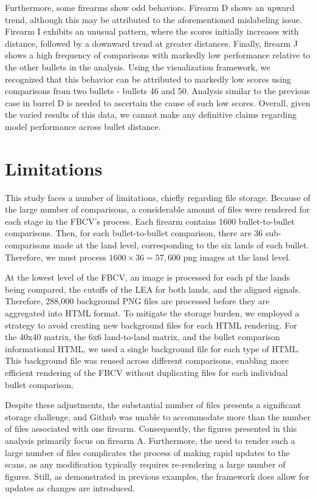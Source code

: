\documentclass[
  number,
  preprint,
  5p,
  twocolumn]{elsarticle}
\begin{document}
Furthermore, some firearms show odd behaviors. Firearm D shows an upward
trend, although this may be attributed to the aforementioned mislabeling
issue. Firearm I exhibits an unusual pattern, where the scores initially
increases with distance, followed by a downward trend at greater
distances. Finally, firearm J shows a high frequency of comparisons with
markedly low performance relative to the other bullets in the analysis.
Using the visualization framework, we recognized that this behavior can
be attributed to markedly low scores using comparisons from two bullets
- bullets 46 and 50. Analysis similar to the previous case in barrel D
is needed to ascertain the cause of such low scores. Overall, given the
varied results of this data, we cannot make any definitive claims
regarding model performance across bullet distance.

\section{Limitations}\label{limitations}

This study faces a number of limitations, chiefly regarding file
storage. Because of the large number of comparisons, a considerable
amount of files were rendered for each stage in the FBCV's process. Each
firearm contains 1600 bullet-to-bullet comparisons. Then, for each
bullet-to-bullet comparison, there are 36 sub-comparisons made at the
land level, corresponding to the six lands of each bullet. Therefore, we
must process \(1600 \times 36 = 57,600\) png images at the land level.

At the lowest level of the FBCV, an image is processed for each pf the
lands being compared, the cutoffs of the LEA for both lands, and the
aligned signals. Therefore, 288,000 background PNG files are processed
before they are aggregated into HTML format. To mitigate the storage
burden, we employed a strategy to avoid creating new background files
for each HTML rendering. For the 40x40 matrix, the 6x6 land-to-land
matrix, and the bullet comparison informational HTML, we used a single
background file for each type of HTML. This background file was reused
across different comparisons, enabling more efficient rendering of the
FBCV without duplicating files for each individual bullet comparison.

Despite these adjustments, the substantial number of files presents a
significant storage challenge, and Github was unable to accommodate more
than the number of files associated with one firearm. Consequently, the
figures presented in this analysis primarily focus on firearm A.
Furthermore, the need to render such a large number of files complicates
the process of making rapid updates to the scans, as any modification
typically requires re-rendering a large number of figures. Still, as
demonstrated in previous examples, the framework does allow for updates
as changes are introduced.
\end{document}
